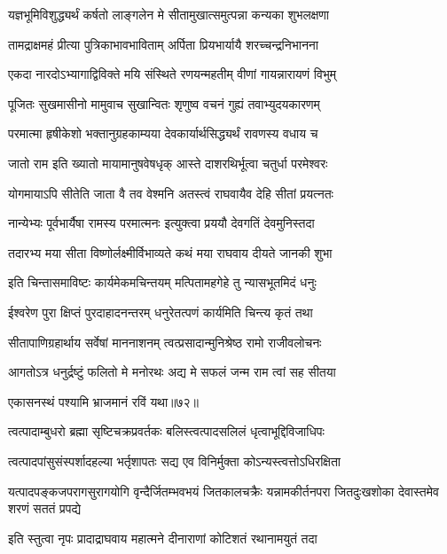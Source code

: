 \twolineshloka
{यज्ञभूमिविशुद्ध्यर्थं कर्षतो लाङ्गलेन मे}
{सीतामुखात्समुत्पन्ना कन्यका शुभलक्षणा} %

\twolineshloka
{तामद्राक्षमहं प्रीत्या पुत्रिकाभावभाविताम्}
{अर्पिता प्रियभार्यायै शरच्चन्द्रनिभानना} %

\twolineshloka
{एकदा नारदोऽभ्यागाद्विविक्ते मयि संस्थिते}
{रणयन्महतीम् वीणां गायन्नारायणं विभुम्} %

\twolineshloka
{पूजितः सुखमासीनो मामुवाच सुखान्वितः}
{शृणुष्व वचनं गुह्यं तवाभ्युदयकारणम्} %

\twolineshloka
{परमात्मा हृषीकेशो भक्तानुग्रहकाम्यया}
{देवकार्यार्थसिद्ध्यर्थं रावणस्य वधाय च} %

\twolineshloka
{जातो राम इति ख्यातो मायामानुषवेषधृक्}
{आस्ते दाशरथिर्भूत्वा चतुर्धा परमेश्वरः} %

\twolineshloka
{योगमायाऽपि सीतेति जाता वै तव वेश्मनि}
{अतस्त्वं राघवायैव देहि सीतां प्रयत्नतः} %

\twolineshloka
{नान्येभ्यः पूर्वभार्यैषा रामस्य परमात्मनः}
{इत्युक्त्वा प्रययौ देवगतिं देवमुनिस्तदा} %

\twolineshloka
{तदारभ्य मया सीता विष्णोर्लक्ष्मीर्विभाव्यते}
{कथं मया राघवाय दीयते जानकी शुभा} %

\twolineshloka
{इति चिन्तासमाविष्टः कार्यमेकमचिन्तयम्}
{मत्पितामहगेहे तु न्यासभूतमिदं धनुः} %

\twolineshloka
{ईश्वरेण पुरा क्षिप्तं पुरदाहादनन्तरम्}
{धनुरेतत्पणं कार्यमिति चिन्त्य कृतं तथा} %

\twolineshloka
{सीतापाणिग्रहार्थाय सर्वेषां माननाशनम्}
{त्वत्प्रसादान्मुनिश्रेष्ठ रामो राजीवलोचनः} %

\twolineshloka
{आगतोऽत्र धनुर्द्रष्टुं फलितो मे मनोरथः}
{अद्य मे सफलं जन्म राम त्वां सह सीतया} %

{एकासनस्थं पश्यामि भ्राजमानं रविं यथा॥७२॥} %


\twolineshloka
{त्वत्पादाम्बुधरो ब्रह्मा सृष्टिचक्रप्रवर्तकः}
{बलिस्त्वत्पादसलिलं धृत्वाभूद्दिविजाधिपः} %

\twolineshloka
{त्वत्पादपांसुसंस्पर्शादहल्या भर्तृशापतः}
{सद्य एव विनिर्मुक्ता कोऽन्यस्त्वत्तोऽधिरक्षिता} %

\fourlineindentedshloka
{यत्पादपङ्कजपरागसुरागयोगि\-}
{वृन्दैर्जितम्भवभयं जितकालचक्रैः}
{यन्नामकीर्तनपरा जितदुःखशोका}
{देवास्तमेव शरणं सततं प्रपद्ये} %

\twolineshloka
{इति स्तुत्वा नृपः प्रादाद्राघवाय महात्मने}
{दीनाराणां कोटिशतं रथानामयुतं तदा} %


